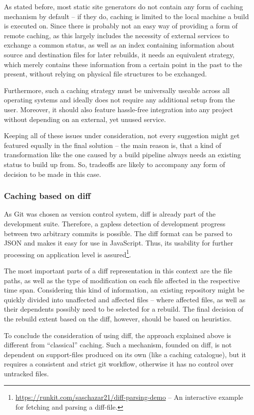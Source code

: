 As stated before, most static site generators do not contain any form of caching mechanism by default -- if they do, caching is limited to the local machine a build is executed on. Since there is probably not an easy way of providing a form of remote caching, as this largely includes the necessity of external services to exchange a common status, as well as an index containing information about source and destination files for later rebuilds, it needs an equivalent strategy, which merely contains these information from a certain point in the past to the present, without relying on physical file structures to be exchanged.

Furthermore, such a caching strategy must be universally useable across all operating systems and ideally does not require any additional setup from the user. Moreover, it should also feature hassle-free integration into any project without depending on an external, yet unused service.

Keeping all of these issues under consideration, not every suggestion might get featured equally in the final solution -- the main reason is, that a kind of transformation like the one caused by a build pipeline always needs an existing status to build up from. So, tradeoffs are likely to accompany any form of decision to be made in this case.

\subsubsection{Caching based on diff}
As Git was chosen as version control system, diff is already part of the development suite. Therefore, a gapless detection of development progress between two arbitrary commits is possible. The diff format can be parsed to JSON and makes it easy for use in JavaScript. Thus, its usability for further processing on application level is assured\footnote{\url{https://runkit.com/saschazar21/diff-parsing-demo} -- An interactive example for fetching and parsing a diff-file.}.

The most important parts of a diff representation in this context are the file paths, as well as the type of modification on each file affected in the respective time span. Considering this kind of information, an existing repository might be quickly divided into unaffected and affected files -- where affected files, as well as their dependents possibly need to be selected for a rebuild. The final decision of the rebuild extent based on the diff, however, should be based on heuristics.

To conclude the consideration of using diff, the approach explained above is different from ``classical'' caching. Such a mechanism, founded on diff, is not dependent on support-files produced on its own (like a caching catalogue), but it requires a consistent and strict git workflow, otherwise it has no control over untracked files.
